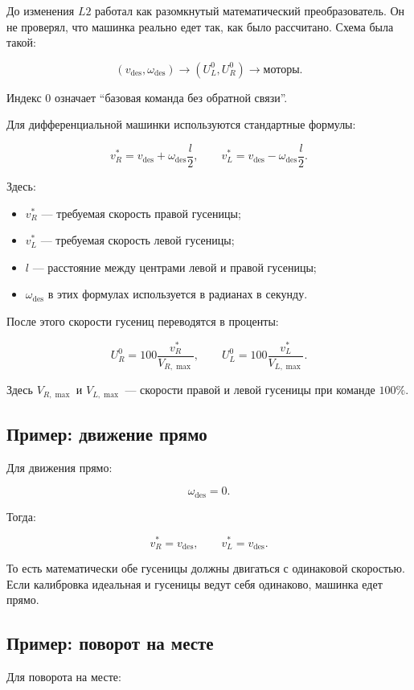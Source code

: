 \documentclass[12pt,a4paper]{article}
\newcommand{\vdes}{v_{\mathrm{des}}}
\newcommand{\wdes}{\omega_{\mathrm{des}}}
\begin{document}
До изменения \(L2\) работал как разомкнутый математический преобразователь.
Он не проверял, что машинка реально едет так, как было рассчитано. Схема была
такой:

\[
(\vdes,\wdes)
\longrightarrow
(U_L^0,U_R^0)
\longrightarrow
\text{моторы}.
\]

Индекс \(0\) означает ``базовая команда без обратной связи''.

Для дифференциальной машинки используются стандартные формулы:

\[
v_R^* = \vdes + \wdes \frac{l}{2},
\qquad
v_L^* = \vdes - \wdes \frac{l}{2}.
\]

Здесь:

\begin{itemize}
  \item \(v_R^*\) --- требуемая скорость правой гусеницы;
  \item \(v_L^*\) --- требуемая скорость левой гусеницы;
  \item \(l\) --- расстояние между центрами левой и правой гусеницы;
  \item \(\wdes\) в этих формулах используется в радианах в секунду.
\end{itemize}

После этого скорости гусениц переводятся в проценты:

\[
U_R^0 = 100 \frac{v_R^*}{V_{R,\max}},
\qquad
U_L^0 = 100 \frac{v_L^*}{V_{L,\max}}.
\]

Здесь \(V_{R,\max}\) и \(V_{L,\max}\) --- скорости правой и левой гусеницы
при команде \(100\%\).

\subsection{Пример: движение прямо}

Для движения прямо:

\[
\wdes = 0.
\]

Тогда:

\[
v_R^* = \vdes,
\qquad
v_L^* = \vdes.
\]

То есть математически обе гусеницы должны двигаться с одинаковой скоростью.
Если калибровка идеальная и гусеницы ведут себя одинаково, машинка едет
прямо.

\subsection{Пример: поворот на месте}

Для поворота на месте:
\end{document}
